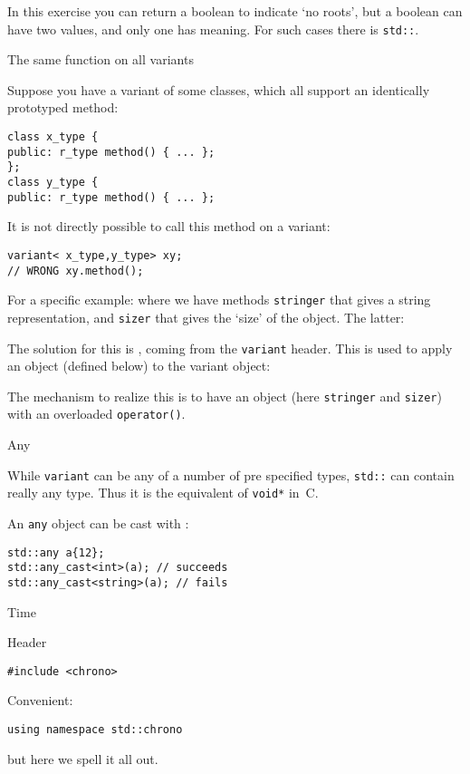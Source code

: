 In this exercise you can return a boolean to indicate `no roots', but
a boolean can have two values, and only one has meaning. For such
cases there is \lstinline{std::}.

 {The same function on all variants}

Suppose you have a variant of some classes,
which all support an identically prototyped method:
\begin{lstlisting}
class x_type {
public: r_type method() { ... };
};
class y_type {
public: r_type method() { ... };
\end{lstlisting}
It is not directly possible to call this method on a variant:
\begin{lstlisting}
variant< x_type,y_type> xy;
// WRONG xy.method();
\end{lstlisting}

For a specific example:
%
%
where we have methods
\lstinline{stringer} that gives a string representation, and
\lstinline{sizer} that gives the `size' of the object.
The latter:

The solution for this is ,
coming from the \lstinline+variant+ header.
This is used to apply an object (defined below) to the variant object:
%

The mechanism to realize this is to have an object
(here \lstinline{stringer} and \lstinline{sizer})
with an overloaded \lstinline+operator()+.

 {Any}
\label{sec:stl-any}

While \lstinline{variant} can be any of a number of pre specified
types, \lstinline{std::} can contain really any
type. Thus it is the equivalent of \lstinline{void*} in~C.

An \lstinline{any} object can be cast with :
\begin{lstlisting}
std::any a{12};
std::any_cast<int>(a); // succeeds
std::any_cast<string>(a); // fails
\end{lstlisting}



 {Time}
\label{sec:chrono}

Header
\begin{lstlisting}
#include <chrono>
\end{lstlisting}

Convenient:
\begin{lstlisting}
using namespace std::chrono
\end{lstlisting}
but here we spell it all out.


